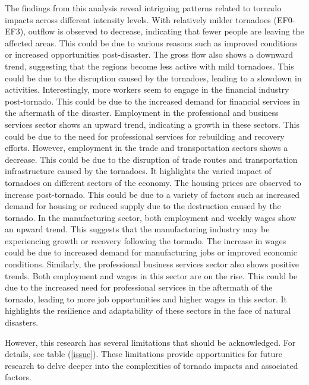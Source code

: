 \documentclass[letterpaper]{article}
\begin{document}
The findings from this analysis reveal intriguing patterns related to tornado impacts across different intensity levels. With relatively milder tornadoes (EF0-EF3), outflow is observed to decrease, indicating that fewer people are leaving the affected areas. This could be due to various reasons such as improved conditions or increased opportunities post-disaster. The gross flow also shows a downward trend, suggesting that the regions become less active with mild tornadoes. This could be due to the disruption caused by the tornadoes, leading to a slowdown in activities. Interestingly, more workers seem to engage in the financial industry post-tornado. This could be due to the increased demand for financial services in the aftermath of the disaster. Employment in the professional and business services sector shows an upward trend, indicating a growth in these sectors. This could be due to the need for professional services for rebuilding and recovery efforts. However, employment in the trade and transportation sectors shows a decrease. This could be due to the disruption of trade routes and transportation infrastructure caused by the tornadoes. It highlights the varied impact of tornadoes on different sectors of the economy. The housing prices are observed to increase post-tornado. This could be due to a variety of factors such as increased demand for housing or reduced supply due to the destruction caused by the tornado. In the manufacturing sector, both employment and weekly wages show an upward trend. This suggests that the manufacturing industry may be experiencing growth or recovery following the tornado. The increase in wages could be due to increased demand for manufacturing jobs or improved economic conditions. Similarly, the professional business services sector also shows positive trends. Both employment and wages in this sector are on the rise. This could be due to the increased need for professional services in the aftermath of the tornado, leading to more job opportunities and higher wages in this sector. It highlights the resilience and adaptability of these sectors in the face of natural disasters.

However, this research has several limitations that should be acknowledged. For details, see table (\ref{issue}). These limitations provide opportunities for future research to delve deeper into the complexities of tornado impacts and associated factors.

\pagebreak
\printbibliography

\newpage
\end{document}
